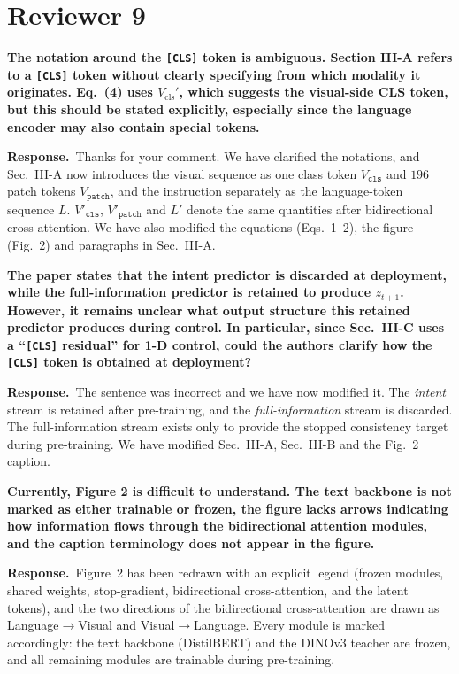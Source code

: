 \documentclass[11pt,a4paper]{article}
\newcommand{\C}[1]{\textbf{#1}\par\vspace{2pt}}
\newcommand{\R}[1]{\textbf{Response.}~#1}
\begin{document}
\section{Reviewer 9}

\begin{qa}

\item \C{The notation around the \texttt{[CLS]} token is ambiguous. Section III-A refers to a
\texttt{[CLS]} token without clearly specifying from which modality it originates. Eq.~(4) uses
$V_{\mathrm{cls}}'$, which suggests the visual-side CLS token, but this should be stated
explicitly, especially since the language encoder may also contain special tokens.}

\R{Thanks for your comment. We have clarified the notations, and Sec.~III-A now introduces the visual sequence as one class token $V_{\texttt{cls}}$ and $196$ patch tokens $V_{\texttt{patch}}$, and the instruction separately as the language-token sequence $L$. $V'_{\texttt{cls}}$, $V'_{\texttt{patch}}$ and $L'$ denote the same quantities after bidirectional cross-attention. We have also modified the equations (Eqs.~1--2), the figure (Fig.~2) and paragraphs in Sec.~III-A.}

\item \C{The paper states that the intent predictor is discarded at deployment, while the
full-information predictor is retained to produce $z_{t+1}$. However, it remains unclear what
output structure this retained predictor produces during control. In particular, since Sec.~III-C
uses a ``\texttt{[CLS]} residual'' for 1-D control, could the authors clarify how the
\texttt{[CLS]} token is obtained at deployment?}
\R{The sentence was incorrect and we have now modified it. The \emph{intent} stream is retained after pre-training, and the \textit{full-information} stream is discarded. The full-information stream exists only to provide the stopped consistency target during pre-training. We have modified Sec.~III-A, Sec.~III-B and the Fig.~2 caption.}

\item \C{Currently, Figure 2 is difficult to understand. The text backbone is not marked as either
trainable or frozen, the figure lacks arrows indicating how information flows through the
bidirectional attention modules, and the caption terminology does not appear in the figure.}
\R{Figure~2 has been redrawn with an explicit legend (frozen modules, shared weights, stop-gradient, bidirectional cross-attention, and the latent tokens), and the two directions of the bidirectional cross-attention are drawn as Language$\rightarrow$Visual and Visual$\rightarrow$Language. Every module is marked accordingly: the text backbone (DistilBERT) and the DINOv3 teacher are frozen, and all remaining modules are trainable during pre-training.}


\end{qa}
\end{document}
